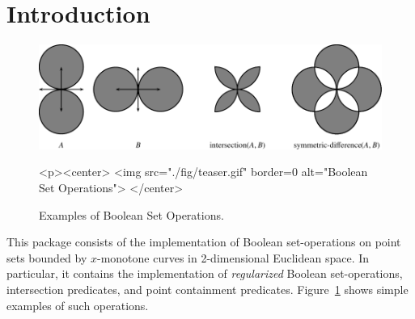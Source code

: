 \lcTex{%
  \newlength{\widthExtra}\setlength{\widthExtra}{1.1cm}
  \newlength{\widthLineReal}\setlength{\widthLineReal}{\linewidth}
  \addtolength{\widthLineReal}{-\widthExtra}
  \newlength{\minipageSpace}\setlength{\minipageSpace}{0.2cm}

  \newlength{\widthLeft}
  \newlength{\widthRight}
}

\newcommand{\reals}{{\rm I\!\hspace{-0.025em} R}}
\newcommand{\calC}{{\cal C}}
\newcommand{\calA}{{\cal A}}
\newcommand{\eps}{{\varepsilon}}
\newcommand{\dcel}{{\sc Dcel}}
\newcommand{\naive}{na\"{\i}ve}
\newcommand{\kdtree}{{\sc Kd}-tree}

\section{Introduction}
\label{bobs_sec:intro}
%
\begin{figure}[!htp]
\begin{ccTexOnly}
  \includegraphics{Boolean_set_operations_2/fig/teaser}
\end{ccTexOnly}
\begin{ccHtmlOnly}
  <p><center>
    <img src="./fig/teaser.gif" border=0 alt="Boolean Set Operations">
  </center>
\end{ccHtmlOnly}
\caption{Examples of Boolean Set Operations.} 
\label{fig:teaser}
\end{figure}

This package consists of the implementation of Boolean set-operations
on point sets bounded by $x$-monotone curves in 2-dimensional
Euclidean space. In particular, it contains the implementation of
{\em regularized} Boolean set-operations, intersection predicates, and
point containment predicates. Figure~\ref{fig:teaser} shows simple examples 
of such operations.

